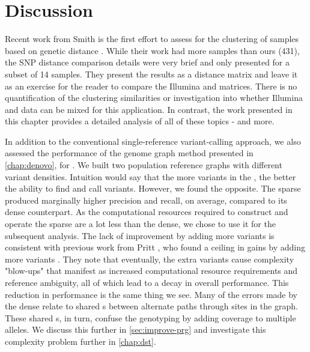 
\section{Discussion}

Recent work from Smith \etal{} is the first effort to assess \ont{} for the clustering of \mtb{} samples based on genetic distance \cite{smith2020}. While their work had more samples than ours (431), the SNP distance comparison details were very brief and only presented for a subset of 14 samples. They present the results as a distance matrix and leave it as an exercise for the reader to compare the Illumina and \ont{} matrices. There is no quantification of the clustering similarities or investigation into whether Illumina and \ont{} data can be mixed for this application. In contrast, the work presented in this chapter provides a detailed analysis of all of these topics - and more.

In addition to the conventional single-reference variant-calling approach, we also assessed the performance of the genome graph method presented in \autoref{chap:denovo}, for \mtb{}. We built two \mtb{} population reference graphs with different variant densities. Intuition would say that the more variants in the \panrg{}, the better the ability to find and call variants. However, we found the opposite. The sparse \panrg{} produced marginally higher precision and recall, on average, compared to its dense counterpart. As the computational resources required to construct and operate the sparse \panrg{} are a lot less than the dense, we chose to use it for the subsequent analysis. The lack of improvement by adding more variants is consistent with previous work from Pritt \etal{}, who found a ceiling in gains by adding more variants \cite{pritt2018}. They note that eventually, the extra variants cause complexity "blow-ups" that manifest as increased computational resource requirements and reference ambiguity, all of which lead to a decay in overall performance. This reduction in performance is the same thing we see. Many of the errors made by the dense \panrg{} relate to shared \kmer{}s between alternate paths through sites in the graph. These shared \kmer{}s, in turn, confuse the genotyping by adding coverage to multiple alleles. We discuss this further in \autoref{sec:improve-prg} and investigate this complexity problem further in \autoref{chap:dst}.

